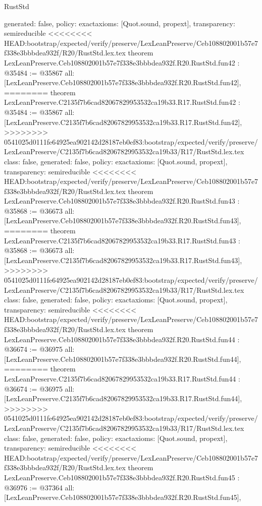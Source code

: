\begin{lexlean}{RustStd}
\begin{coremodule}
{\begin{coremodule}
{{{{{{{{{{{{{{{{{{{{{{{{{{{{{{{{{{{{{{{{{{{{{  generated: false,
  policy: exact{axioms: [Quot.sound, propext]},
  transparency: semireducible
}
<<<<<<<< HEAD:bootstrap/expected/verify/preserve/LexLeanPreserve/Ceb108802001b57e7f338e3bbbdea932f/R20/RustStd.lex.tex
theorem LexLeanPreserve.Ceb108802001b57e7f338e3bbbdea932f.R20.RustStd.fun42 : @35484 := @35867 {
  all: [LexLeanPreserve.Ceb108802001b57e7f338e3bbbdea932f.R20.RustStd.fun42],
========
theorem LexLeanPreserve.C2135f7b6cad82067829953532ca19b33.R17.RustStd.fun42 : @35484 := @35867 {
  all: [LexLeanPreserve.C2135f7b6cad82067829953532ca19b33.R17.RustStd.fun42],
>>>>>>>> 0541025d0111fe64925ea902142d28187eb0ef83:bootstrap/expected/verify/preserve/LexLeanPreserve/C2135f7b6cad82067829953532ca19b33/R17/RustStd.lex.tex
  class: false,
  generated: false,
  policy: exact{axioms: [Quot.sound, propext]},
  transparency: semireducible
}
<<<<<<<< HEAD:bootstrap/expected/verify/preserve/LexLeanPreserve/Ceb108802001b57e7f338e3bbbdea932f/R20/RustStd.lex.tex
theorem LexLeanPreserve.Ceb108802001b57e7f338e3bbbdea932f.R20.RustStd.fun43 : @35868 := @36673 {
  all: [LexLeanPreserve.Ceb108802001b57e7f338e3bbbdea932f.R20.RustStd.fun43],
========
theorem LexLeanPreserve.C2135f7b6cad82067829953532ca19b33.R17.RustStd.fun43 : @35868 := @36673 {
  all: [LexLeanPreserve.C2135f7b6cad82067829953532ca19b33.R17.RustStd.fun43],
>>>>>>>> 0541025d0111fe64925ea902142d28187eb0ef83:bootstrap/expected/verify/preserve/LexLeanPreserve/C2135f7b6cad82067829953532ca19b33/R17/RustStd.lex.tex
  class: false,
  generated: false,
  policy: exact{axioms: [Quot.sound, propext]},
  transparency: semireducible
}
<<<<<<<< HEAD:bootstrap/expected/verify/preserve/LexLeanPreserve/Ceb108802001b57e7f338e3bbbdea932f/R20/RustStd.lex.tex
theorem LexLeanPreserve.Ceb108802001b57e7f338e3bbbdea932f.R20.RustStd.fun44 : @36674 := @36975 {
  all: [LexLeanPreserve.Ceb108802001b57e7f338e3bbbdea932f.R20.RustStd.fun44],
========
theorem LexLeanPreserve.C2135f7b6cad82067829953532ca19b33.R17.RustStd.fun44 : @36674 := @36975 {
  all: [LexLeanPreserve.C2135f7b6cad82067829953532ca19b33.R17.RustStd.fun44],
>>>>>>>> 0541025d0111fe64925ea902142d28187eb0ef83:bootstrap/expected/verify/preserve/LexLeanPreserve/C2135f7b6cad82067829953532ca19b33/R17/RustStd.lex.tex
  class: false,
  generated: false,
  policy: exact{axioms: [Quot.sound, propext]},
  transparency: semireducible
}
<<<<<<<< HEAD:bootstrap/expected/verify/preserve/LexLeanPreserve/Ceb108802001b57e7f338e3bbbdea932f/R20/RustStd.lex.tex
theorem LexLeanPreserve.Ceb108802001b57e7f338e3bbbdea932f.R20.RustStd.fun45 : @36976 := @37364 {
  all: [LexLeanPreserve.Ceb108802001b57e7f338e3bbbdea932f.R20.RustStd.fun45],
}}}}}}}}}}}}}}}}}}}}}}}}}}}}}}}}}}}}}}}}}}}}}}}}
\end{coremodule}}
\end{coremodule}
\end{lexlean}
